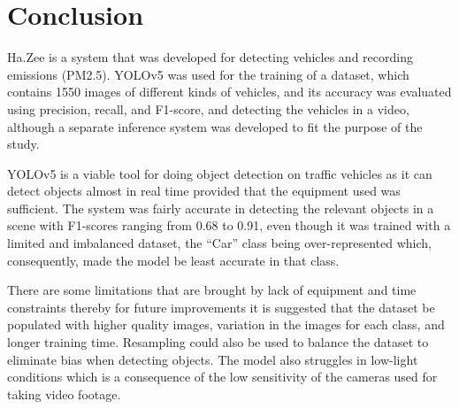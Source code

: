 \chapter{Conclusion}

Ha.Zee is a system that was developed for detecting vehicles and recording emissions (PM2.5). YOLOv5 was used for the training of a dataset, which contains 1550 images of different kinds of vehicles, and its accuracy was evaluated using precision, recall, and F1-score, and detecting the vehicles in a video, although a separate inference system was developed to fit the purpose of the study. 

YOLOv5 is a viable tool for doing object detection on traffic vehicles as it can detect objects almost in real time provided that the equipment used was sufficient. The system was fairly accurate in detecting the relevant objects in a scene with F1-scores ranging from 0.68 to 0.91, even though it was trained with a limited and imbalanced dataset, the “Car” class being over-represented which, consequently, made the model be least accurate in that class.

There are some limitations that are brought by lack of equipment and time constraints thereby for future improvements it is suggested that the dataset be populated with higher quality images, variation in the images for each class, and longer training time. Resampling could also be used to balance the dataset to eliminate bias when detecting objects. The model also struggles in low-light conditions which is a consequence of the low sensitivity of the cameras used for taking video footage. 
